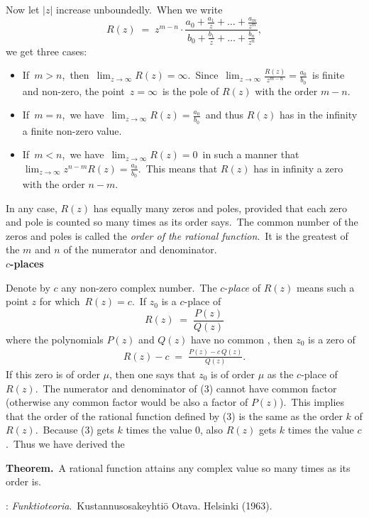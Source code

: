 \documentclass[12pt]{article}
\theoremstyle{definition}
\begin{document}
Now let $|z|$ increase unboundedly.\, When we write
$$R(z) \;=\; z^{m-n}\cdot\frac
{a_0+\frac{a_1}{z}+\ldots+\frac{a_m}{z^m}}
{b_0+\frac{b_1}{z}+\ldots+\frac{b_n}{z^n}},$$
we get three cases:
\begin{itemize}
\item If\, $m > n$,\, then\, $\lim_{z\to\infty}R(z) = \infty$.\, Since\, $\lim_{z\to\infty}\frac{R(z)}{z^{m-n}} = \frac{a_0}{b_0}$\, is finite and non-zero, the point\, $z = \infty$\, is the pole of $R(z)$ with the order $m\!-\!n$.
\item If\, $m = n$,\, we have\, $\lim_{z\to\infty}R(z) = \frac{a_0}{b_0}$\, and thus $R(z)$ has in the infinity a finite non-zero value.
\item If\, $m < n$,\, we have\, $\lim_{z\to\infty}R(z) = 0$\, in such a manner that\, $\lim_{z\to\infty}z^{n-m}R(z) = \frac{a_0}{b_0}$.\, This means that $R(z)$ has in infinity a zero with the order $n\!-\!m$.
\end{itemize}
In any case, $R(z)$ has equally many zeros and poles, provided that each zero and pole is counted so many times as its order says.\, The common number of the zeros and poles is called the {\em order of the rational function}.\, It is the greatest of the  $m$ and $n$ of the numerator and denominator.\\

\textbf{$c$-places}

Denote by $c$ any non-zero complex number.\, The $c$-{\em place} of $R(z)$ means such a point $z$ for which\, $R(z) = c$.\, If $z_0$ is a $c$-place of 
$$R(z) \;=\; \frac{P(z)}{Q(z)}$$
where the polynomials $P(z)$ and $Q(z)$ have no common , then $z_0$ is a zero of
\begin{align}
  R(z)\!-\!c \;=\; \frac{P(z)\!-\!c\,Q(z)}{Q(z)}.
\end{align}
If this zero is of order $\mu$, then one says that $z_0$ is of order $\mu$ as the $c$-place of $R(z)$.\, The numerator and denominator of (3) cannot have common factor (otherwise any common factor would be also a factor of $P(z)$).\, This implies that the order of the rational function defined by (3) is the same as the order $k$ of $R(z)$.\, Because (3) gets $k$ times the value $0$, also $R(z)$ gets $k$ times the value $c$.\, Thus we have derived the

\textbf{Theorem.}\, A rational function attains any complex value so many times as its order is.

\begin{thebibliography}{9}
: {\em Funktioteoria}.\, Kustannusosakeyhti\"o Otava. Helsinki (1963).
\end{thebibliography}\\


\end{document}
